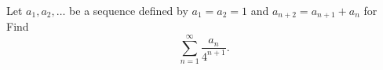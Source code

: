 Let $a_1,a_2,\ldots$ be a sequence defined by $a_1=a_2=1$ and $a_{n+2}=a_{n+1}+a_n$ for   Find \[\sum_{n=1}^\infty \dfrac{a_n}{4^{n+1}}.\]